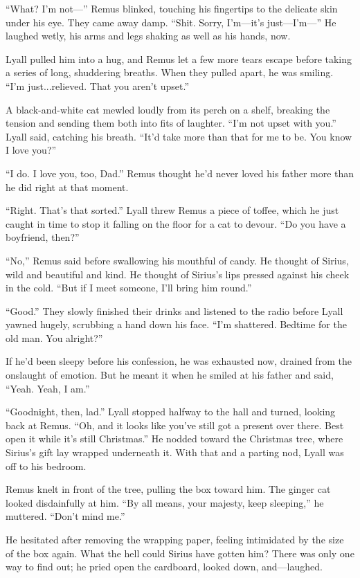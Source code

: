 “What? I’m not—” Remus blinked, touching his fingertips to the delicate skin under his eye. They came away damp. “Shit. Sorry, I’m—it’s just—I’m—” He laughed wetly, his arms and legs shaking as well as his hands, now.

Lyall pulled him into a hug, and Remus let a few more tears escape before taking a series of long, shuddering breaths. When they pulled apart, he was smiling. “I’m just...relieved. That you aren’t upset.”

A black-and-white cat mewled loudly from its perch on a shelf, breaking the tension and sending them both into fits of laughter. “I’m not upset with you.” Lyall said, catching his breath. “It’d take more than that for me to be. You know I love you?”

“I do. I love you, too, Dad.” Remus thought he’d never loved his father more than he did right at that moment.

“Right. That’s that sorted.” Lyall threw Remus a piece of toffee, which he just caught in time to stop it falling on the floor for a cat to devour. “Do you have a boyfriend, then?”

“No,” Remus said before swallowing his mouthful of candy. He thought of Sirius, wild and beautiful and kind. He thought of Sirius’s lips pressed against his cheek in the cold. “But if I meet someone, I’ll bring him round.”

“Good.” They slowly finished their drinks and listened to the radio before Lyall yawned hugely, scrubbing a hand down his face. “I’m shattered. Bedtime for the old man. You alright?”

If he’d been sleepy before his confession, he was exhausted now, drained from the onslaught of emotion. But he meant it when he smiled at his father and said, “Yeah. Yeah, I am.”

“Goodnight, then, lad.” Lyall stopped halfway to the hall and turned, looking back at Remus. “Oh, and it looks like you’ve still got a present over there. Best open it while it’s still Christmas.” He nodded toward the Christmas tree, where Sirius’s gift lay wrapped underneath it. With that and a parting nod, Lyall was off to his bedroom.

Remus knelt in front of the tree, pulling the box toward him. The ginger cat looked disdainfully at him. “By all means, your majesty, keep sleeping,” he muttered. “Don’t mind me.”

He hesitated after removing the wrapping paper, feeling intimidated by the size of the box again. What the hell could Sirius have gotten him? There was only one way to find out; he pried open the cardboard, looked down, and—laughed.

